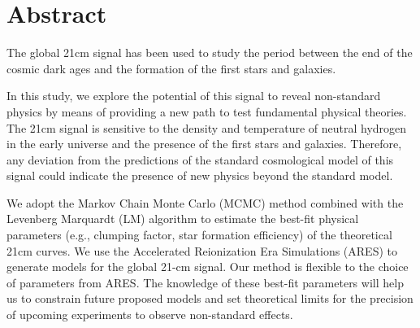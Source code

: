 \documentclass[12pt, TexShade, letterpaper]{report}
\begin{document}
\chapter*{Abstract}
	\label{chap:engAbstract}
The global 21cm signal has been used to study the period between the end of the cosmic dark ages and the formation of the first stars and galaxies. \par
In this study, we explore the potential of this signal to reveal non-standard physics by means of providing a new path to test fundamental physical theories. The 21cm signal is sensitive to the density and temperature of neutral hydrogen in the early universe and the presence of the first stars and galaxies. Therefore, any deviation from the predictions of the standard cosmological model of this signal could indicate the presence of new physics beyond the standard model.\par
We adopt the Markov Chain Monte Carlo (MCMC) method combined with the Levenberg Marquardt (LM) algorithm to estimate the best-fit physical parameters (e.g., clumping factor, star formation efficiency) of the theoretical 21cm curves. We use the Accelerated Reionization Era Simulations (ARES) to generate models for the global 21-cm signal. Our method is flexible to the choice of parameters from ARES.
The knowledge of these best-fit parameters will help us to constrain future proposed models and set theoretical limits for the precision of upcoming experiments to observe non-standard effects.\par
\end{document}
